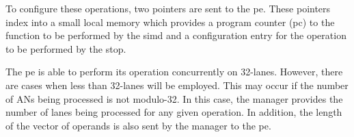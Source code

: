 To configure these operations, two pointers are sent to the \ac{pe}. These pointers index into a small local memory which provides a program counter (\ac{pc}) to the function to be performed by the \ac{simd} and a configuration entry for the operation to be performed by the \ac{stop}.

The \ac{pe} is able to perform its operation concurrently on 32-lanes. However, there are cases when less than 32-lanes will be employed. This may occur if the number of ANs being processed is not modulo-32. In this case, the manager provides the number of lanes being processed for any given operation. In addition, the length of the vector of operands is also sent by the manager to the \ac{pe}.




